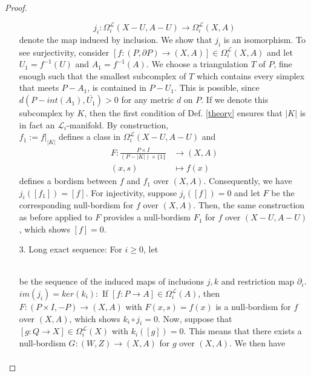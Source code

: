 \documentclass{scrreprt}
\begin{document}
\begin{proof}
\begin{itemize}
\begin{equation*}
j_i: \Omega_i^{\mathcal{L}}(X-U, A-U) \to \Omega_i^{\mathcal{L}}(X,A)
\end{equation*}
denote the map induced by inclusion. We show that $j_i$ is an isomorphism. To see surjectivity, consider $[f: (P, \partial P) \to (X,A)] \in \Omega_i^{\mathcal{L}}(X,A)$ and let $U_1 = f^{-1}(U)$ and $A_1= f^{-1}(A)$. We choose a triangulation $T$ of $P$, fine enough such that the smallest subcomplex of $T$ which contains every simplex that meets $P-A_1$, is contained in $P-U_1$. This is possible, since $d(P-int(A_1), \overline{U_1})>0$ for any metric $d$ on $P$. If we denote this subcomplex by $K$, then the first condition of Def. \ref{theory} ensures that $|K|$ is in fact an $\mathcal{L}_i$-manifold. By construction, \\ $f_1:=f|_{|K|}$ defines a class in $\Omega_i^{\mathcal{L}}(X-U,A-U)$ and 
\begin{align*}
F: \frac{P \times I}{ (P-|K|) \times \{ 1 \} } &\to (X,A) \\
(x,s) &\mapsto f(x)
\end{align*}
defines a bordism between $f$ and $f_1$ over $(X,A)$. Consequently, we have \\ $j_i ([f_1]) = [f]$. For injectivity, suppose $j_i([f])=0$ and let $F$ be the corresponding null-bordism for $f$ over $(X,A)$. Then, the same construction as before applied to $F$ provides a null-bordism $F_1$ for $f$ over $(X-U,A-U)$, which shows $[f]=0$.
\item[3.] Long exact sequence: For $i \geq 0$, let \\
\\
be the sequence of the induced maps of inclusions $j,k$ and restriction map $\partial_i$. \\
{$im(j_i) = ker(k_i):$} If $[f:P \to A] \in \Omega_i^{\mathcal{L}}(A)$, then $F: (P \times I, -P) \to (X,A)$ with $F(x,s)=f(x)$ is a null-bordism for $f$ over $(X,A)$, which shows $k_i \circ j_i = 0$. Now, suppose that $[g: Q \to X] \in \Omega_i^{\mathcal{L}}(X)$ with $k_i([g])=0$. This means that there exists a null-bordism $G: (W,Z) \to (X,A)$ for $g$ over $(X,A)$. We then have 
\begin{align*}

\end{align*}
\end{itemize}
\end{proof}
\end{document}
